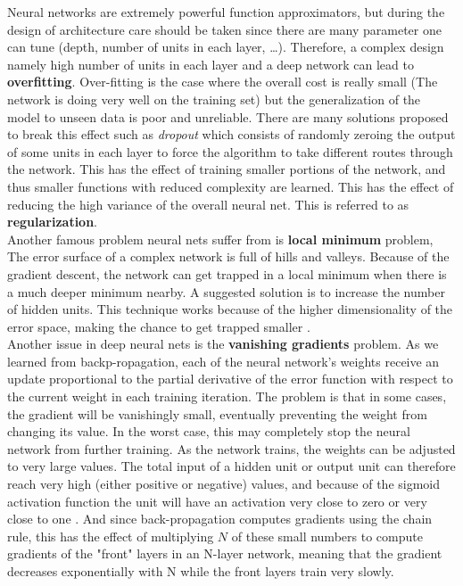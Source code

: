 Neural networks are extremely powerful function approximators, but during the design of architecture care should be taken since there are many parameter one can tune (depth, number of units in each layer, \ldots). Therefore, a complex design namely high number of units in each layer and a deep network can lead to \textbf{overfitting}. Over-fitting is the case where the overall cost is really small (The network is doing very well on the training set) but the generalization of the model to unseen data is poor and unreliable. There are many solutions proposed to break this effect such as \emph{dropout} which consists of randomly zeroing the output of some units in each layer to force the algorithm to take different routes through the network. This has the effect of training smaller portions of the network, and thus smaller functions with reduced complexity are learned. This has the effect of reducing the high variance of the overall neural net. This is referred to as \textbf{regularization}. \\
Another famous problem neural nets suffer from is \textbf{local minimum} problem, The error surface of a complex network is full of hills and valleys. Because of the gradient descent, the network can get trapped in a local minimum when there is a much deeper minimum nearby. A suggested solution is to increase the number of hidden units. This technique works because of the higher dimensionality of the error space, making the chance to get trapped smaller \cite{atnn}. \\
Another issue in deep neural nets is the \textbf{vanishing gradients} problem. As we learned from backp-ropagation, each of the neural network's weights receive an update proportional to the partial derivative of the error function with respect to the current weight in each training iteration. The problem is that in some cases, the gradient will be vanishingly small, eventually preventing the weight from changing its value. In the worst case, this may completely stop the neural network from further training. As the network trains, the weights can be adjusted to very large values. The total input of a hidden unit or output unit can therefore reach very high (either positive or
negative) values, and because of the sigmoid activation function the unit will have an activation very close to zero or very close to one \cite{atnn}. And since back-propagation computes gradients using the chain rule, this has the effect of multiplying $N$ of these small numbers to compute gradients of the "front" layers in an N-layer network, meaning that the gradient decreases exponentially with N while the front layers train very slowly.\\
